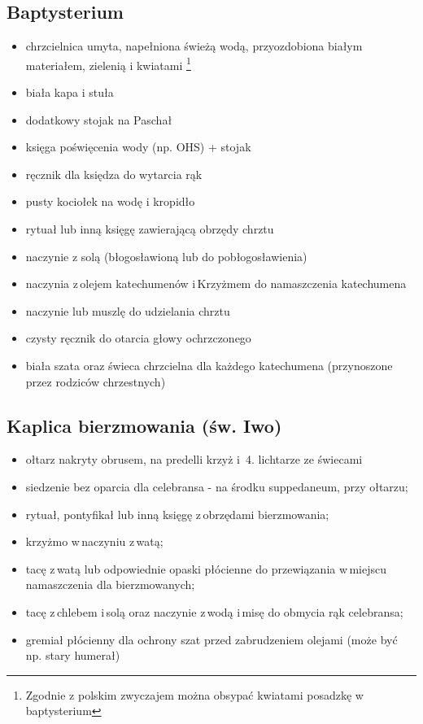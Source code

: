 \subsection{Baptysterium}
\begin{itemize}
	\item chrzcielnica umyta, napełniona świeżą wodą, przyozdobiona
	      białym materiałem, zielenią i kwiatami \footnote{Zgodnie z polskim
		      zwyczajem można obsypać kwiatami posadzkę w baptysterium}
	\item \textcolor{black!50}{biała kapa i stuła}
	\item dodatkowy stojak na Paschał
	\item księga poświęcenia wody (np. OHS) + stojak
	\item ręcznik dla księdza do wytarcia rąk
	\item pusty kociołek na wodę i kropidło
	\item rytuał lub inną księgę zawierającą obrzędy chrztu
	\item naczynie z solą (błogosławioną lub do pobłogosławienia)
	\item naczynia z olejem katechumenów i Krzyżmem do namaszczenia katechumena
	\item naczynie lub muszlę do udzielania chrztu
	\item czysty ręcznik do otarcia głowy ochrzczonego
	\item biała szata oraz świeca chrzcielna dla każdego katechumena
	      (przynoszone przez rodziców chrzestnych)
\end{itemize}

\subsection{Kaplica bierzmowania (św. Iwo)}
\begin{itemize}
	\item ołtarz nakryty obrusem, na predelli krzyż i  4. lichtarze ze świecami
	\item siedzenie bez oparcia dla celebransa - na środku suppedaneum, przy
	      ołtarzu;
	\item rytuał, pontyfikał lub inną księgę z obrzędami bierzmowania;
	\item krzyżmo w naczyniu z watą;
	\item tacę z watą lub odpowiednie opaski płócienne do przewiązania w miejscu
	      namaszczenia dla bierzmowanych;
	\item tacę z chlebem i solą oraz naczynie z wodą i misę do obmycia rąk
	      celebransa;
	\item gremiał płócienny dla ochrony szat przed zabrudzeniem olejami (może
	      być np. stary humerał)
\end{itemize}

